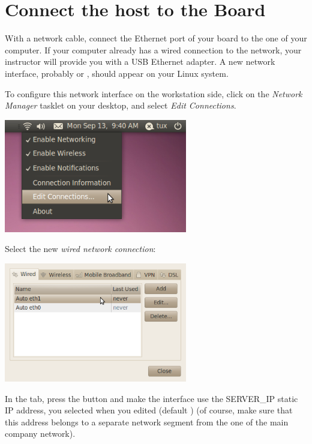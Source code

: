 
\section{Connect the host to the \devboard Board}

With a network cable, connect the Ethernet port of your board to the
one of your computer. If your computer already has a wired connection
to the network, your instructor will provide you with a USB Ethernet
adapter. A new network interface, probably  or ,
should appear on your Linux system.

To configure this network interface on the workstation side, click on
the {\em Network Manager} tasklet on your desktop, and select {\em
  Edit Connections}.

\begin{center}
\includegraphics[width=8cm]{labs/setup-network/network-config-1.png}
\end{center}

Select the new {\em wired network connection}:

\begin{center}
\includegraphics[width=8cm]{labs/setup-network/network-config-2.png}
\end{center}

In the  tab, press the  button
and make the interface use the SERVER\_IP static IP address,
you selected when you edited  (default \serverip) (of course, make sure that this
address belongs to a separate network segment from the one of the main
company network).

